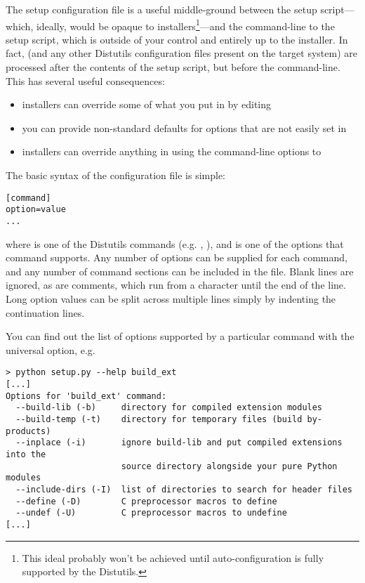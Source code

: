 \documentclass{manual}
\begin{document}
The setup configuration file is a useful middle-ground between the setup
script---which, ideally, would be opaque to installers\footnote{This
  ideal probably won't be achieved until auto-configuration is fully
  supported by the Distutils.}---and the command-line to the setup
script, which is outside of your control and entirely up to the
installer.  In fact,  (and any other Distutils
configuration files present on the target system) are processed after
the contents of the setup script, but before the command-line.  This has 
several useful consequences:
\begin{itemize}
\item installers can override some of what you put in  by
  editing 
\item you can provide non-standard defaults for options that are not
  easily set in 
\item installers can override anything in  using the
  command-line options to 
\end{itemize}

The basic syntax of the configuration file is simple:

\begin{verbatim}
[command]
option=value
...
\end{verbatim}

where  is one of the Distutils commands (e.g.
, ), and  is one of
the options that command supports.  Any number of options can be
supplied for each command, and any number of command sections can be
included in the file.  Blank lines are ignored, as are comments, which
run from a \character{\#} character until the end of the line.  Long
option values can be split across multiple lines simply by indenting
the continuation lines.

You can find out the list of options supported by a particular command
with the universal  option, e.g.

\begin{verbatim}
> python setup.py --help build_ext
[...]
Options for 'build_ext' command:
  --build-lib (-b)     directory for compiled extension modules
  --build-temp (-t)    directory for temporary files (build by-products)
  --inplace (-i)       ignore build-lib and put compiled extensions into the
                       source directory alongside your pure Python modules
  --include-dirs (-I)  list of directories to search for header files
  --define (-D)        C preprocessor macros to define
  --undef (-U)         C preprocessor macros to undefine
[...]
\end{verbatim}
\end{document}
